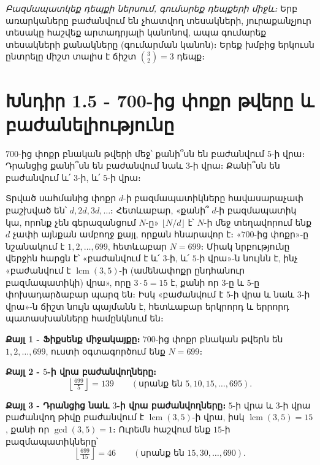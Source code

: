 \documentclass[11pt,a4paper]{article}
\begin{document}
\begin{methodbox}
\emph{Բազմապատկեք դեպքի ներսում, գումարեք դեպքերի միջև։} Երբ առարկաները
բաժանվում են չհատվող տեսակների, յուրաքանչյուր տեսակը հաշվեք արտադրյալի կանոնով, ապա գումարեք
տեսակների քանակները (գումարման կանոն)։ Երեք խմբից երկուսն ընտրելը միշտ տալիս է ճիշտ $\binom{3}{2}=3$ դեպք։
\end{methodbox}

\section*{Խնդիր 1.5 - 700-ից փոքր թվերը և բաժանելիությունը}

\begin{problembox}[1.5]
$700$-ից փոքր բնական թվերի մեջ՝ քանի՞սն են բաժանվում $5$-ի վրա։ Դրանցից քանի՞սն են բաժանվում նաև
$3$-ի վրա։ Քանի՞սն են բաժանվում և՛ $3$-ի, և՛ $5$-ի վրա։
\end{problembox}

\begin{ideabox}
Տրված սահմանից փոքր $d$-ի բազմապատիկները հավասարաչափ բաշխված են՝ $d,2d,3d,\dots$։ Հետևաբար, «քանի՞ $d$-ի
բազմապատիկ կա, որոնք չեն գերազանցում $N$-ը» $\lfloor N/d\rfloor$ է՝ $N$-ի մեջ տեղավորում ենք $d$ չափի
այնքան ամբողջ քայլ, որքան հնարավոր է։ «$700$-ից փոքր»-ը նշանակում է $1,2,\dots,699$, հետևաբար $N=699$։
Միակ նրբությունը վերջին հարցն է՝ «բաժանվում է և՛ $3$-ի, և՛ $5$-ի վրա»-ն նույնն է, ինչ «բաժանվում է
$\operatorname{lcm}(3,5)$-ի (ամենափոքր ընդհանուր բազմապատիկի) վրա», որը $3\cdot 5=15$ է, քանի որ $3$-ը և $5$-ը
փոխադարձաբար պարզ են։ Իսկ «բաժանվում է $5$-ի վրա և նաև $3$-ի վրա»-ն ճիշտ նույն պայմանն է, հետևաբար
երկրորդ և երրորդ պատասխանները համընկնում են։
\end{ideabox}

\textbf{Քայլ 1 - Ֆիքսենք միջակայքը։}
$700$-ից փոքր բնական թվերն են $1,2,\dots,699$, ուստի օգտագործում ենք $N=699$։

\textbf{Քայլ 2 - $5$-ի վրա բաժանվողները։}
\[
\left\lfloor \tfrac{699}{5}\right\rfloor = 139 \qquad(\text{սրանք են } 5,10,15,\dots,695).
\]

\textbf{Քայլ 3 - Դրանցից նաև $3$-ի վրա բաժանվողները։}
$5$-ի վրա և $3$-ի վրա բաժանվող թիվը բաժանվում է $\operatorname{lcm}(3,5)$-ի վրա, իսկ $\operatorname{lcm}(3,5)=15$, քանի որ
$\gcd(3,5)=1$։ Ուրեմն հաշվում ենք $15$-ի բազմապատիկները՝
\[
\left\lfloor \tfrac{699}{15}\right\rfloor = 46 \qquad(\text{սրանք են } 15,30,\dots,690).
\]
\end{document}
